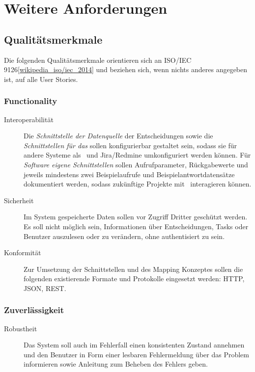 \section{Weitere Anforderungen}

	\subsection{Qualitätsmerkmale}
		Die folgenden Qualitätsmerkmale orientieren sich an ISO/IEC 9126\ref{wikipedia_iso/iec_2014} und beziehen sich, wenn nichts anderes angegeben ist, auf alle User Stories.

		\subsubsection{Functionality}
		\begin{description}
			\item[Interoperabilität] Die \textit{Schnittstelle der Datenquelle} der Entscheidungen sowie die \textit{Schnittstellen für das \ppt} sollen konfigurierbar gestaltet sein, sodass sie für andere Systeme als \cdar\ und Jira/Redmine umkonfiguriert werden können. 
			Für \textit{Software eigene Schnittstellen} sollen Aufrufparameter, Rückgabewerte und jeweils mindestens zwei Beispielaufrufe und Beispielantwortdatensätze dokumentiert werden, sodass zukünftige Projekte mit \eeppi\ interagieren können.
			\item[Sicherheit] Im System gespeicherte Daten sollen vor Zugriff Dritter geschützt werden.
			Es soll nicht möglich sein, Informationen über Entscheidungen, Tasks oder Benutzer auszulesen oder zu verändern, 
			ohne authentisiert zu sein.
			\item[Konformität] Zur Umsetzung der Schnittstellen und des Mapping Konzeptes sollen die folgenden existierende Formate und Protokolle eingesetzt werden: HTTP, JSON, REST.
		\end{description}
		
		
		\subsubsection{Zuverlässigkeit}
		\begin{description}
			\item[Robustheit] Das System soll auch im Fehlerfall einen konsistenten Zustand annehmen und den Benutzer in Form einer lesbaren Fehlermeldung über das Problem informieren sowie Anleitung zum Beheben des Fehlers geben.
		\end{description}
		

